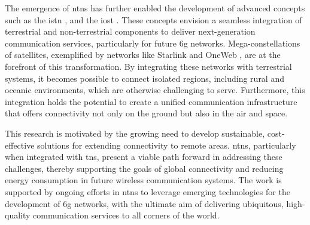 The emergence of \glspl{ntn} has further enabled the development of advanced concepts such as the \gls{istn} \autocite{ao2018space}\autocite{huang2019airplane}\autocite{liu2022operation}, and the \gls{iost} \autocite{akyildiz2019internet}\autocite{priyadarshini2022novel}\autocite{kak2021designing}. These concepts envision a seamless integration of terrestrial and non-terrestrial components to deliver next-generation communication services, particularly for future \gls{6g} networks. Mega-constellations of satellites, exemplified by networks like Starlink \autocite{tao2022impact} and OneWeb \autocite{zhu2022laser}, are at the forefront of this transformation. By integrating these networks with terrestrial systems, it becomes possible to connect isolated regions, including rural and oceanic environments, which are otherwise challenging to serve. Furthermore, this integration holds the potential to create a unified communication infrastructure that offers connectivity not only on the ground but also in the air and space.

This research is motivated by the growing need to develop sustainable, cost-effective solutions for extending connectivity to remote areas. \glspl{ntn}, particularly when integrated with \glspl{tn}, present a viable path forward in addressing these challenges, thereby supporting the goals of global connectivity and reducing energy consumption in future wireless communication systems. The work is supported by ongoing efforts in \glspl{ntn} to leverage emerging technologies for the development of \gls{6g} networks, with the ultimate aim of delivering ubiquitous, high-quality communication services to all corners of the world.


